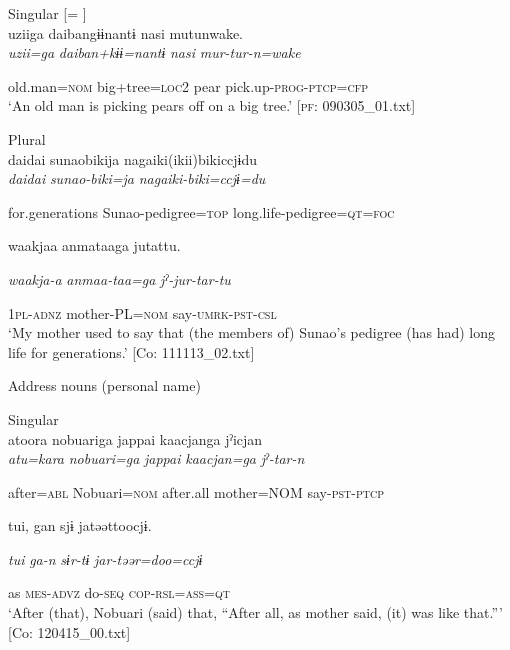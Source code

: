 \begin{table}
\ex  Singular [= ]\\

{\TM}
\glll uziiga  daibangɨɨnantɨ  nasi  mutunwake.\\

      \textit{uzii=ga}  \textit{daiban+kɨɨ=nantɨ}  \textit{nasi}  \textit{mur-tur-n=wake}

      old.man=\textsc{nom}  big+tree=\textsc{loc}2  pear  pick.up-\textsc{prog}-\textsc{ptcp}=\textsc{cfp}\\
\glt ‘An old man is picking pears off on a big tree.’ [\textsc{pf}: 090305\_01.txt]
\z

\ex  Plural\\

{\TM}
\glll daidai  sunaobikija  nagaiki(ikii)bikiccjɨdu\\

      \textit{daidai}  \textit{sunao-biki=ja}  \textit{nagaiki-biki=ccjɨ=du}

      for.generations  Sunao-pedigree=\textsc{top}  long.life-pedigree=\textsc{qt}=\textsc{foc}

      waakjaa  anmataaga  jutattu.

      \textit{waakja-a}  \textit{anmaa-taa=ga}  \textit{jˀ-jur-tar-tu}

      1\textsc{pl}-\textsc{adnz}  mother-PL=\textsc{nom}  say-\textsc{umrk}-\textsc{pst}-\textsc{csl}\\
\glt ‘My mother used to say that (the members of) Sunao’s pedigree (has had) long life for generations.’ [Co: 111113\_02.txt]
\z

  Address nouns (personal name)

\ex  Singular\\

{\TM}
\glll atoora  nobuariga  jappai  {\textbar}kaacjan{\textbar}ga  jˀicjan\\

      \textit{atu=kara}  \textit{nobuari=ga}  \textit{jappai}  \textit{kaacjan=ga}  \textit{jˀ-tar-n}

      after=\textsc{abl}  Nobuari=\textsc{nom}  after.all  mother=NOM  say-\textsc{pst}-\textsc{ptcp}

      tui,  gan  sjɨ  jatəəttoocjɨ.

      \textit{tui}  \textit{ga-n}  \textit{sɨr-tɨ}  \textit{jar-təər=doo=ccjɨ}

      as  \textsc{mes}-\textsc{advz}  do-\textsc{seq}  \textsc{cop}-\textsc{rsl}=\textsc{ass}=\textsc{qt}\\
\glt ‘After (that), Nobuari (said) that, “After all, as mother said, (it) was like that.”’ [Co: 120415\_00.txt]
\z


\end{table}
